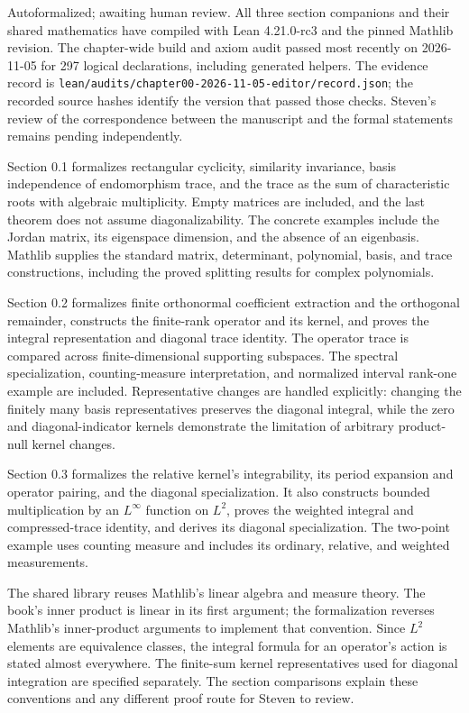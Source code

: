 \label{first-target-finite-dimensional-trace}

Autoformalized; awaiting human review. All three section companions and their shared mathematics have compiled with Lean 4.21.0-rc3 and the pinned Mathlib revision. The chapter-wide build and axiom audit passed most recently on 2026-11-05 for 297 logical declarations, including generated helpers. The evidence record is \texttt{lean/audits/chapter00-2026-11-05-editor/record.json}; the recorded source hashes identify the version that passed those checks. Steven's review of the correspondence between the manuscript and the formal statements remains pending independently.

Section 0.1 formalizes rectangular cyclicity, similarity invariance, basis independence of endomorphism trace, and the trace as the sum of characteristic roots with algebraic multiplicity. Empty matrices are included, and the last theorem does not assume diagonalizability. The concrete examples include the Jordan matrix, its eigenspace dimension, and the absence of an eigenbasis. Mathlib supplies the standard matrix, determinant, polynomial, basis, and trace constructions, including the proved splitting results for complex polynomials.

\label{chapter-zero-formalization-roadmap}

Section 0.2 formalizes finite orthonormal coefficient extraction and the orthogonal remainder, constructs the finite-rank operator and its kernel, and proves the integral representation and diagonal trace identity. The operator trace is compared across finite-dimensional supporting subspaces. The spectral specialization, counting-measure interpretation, and normalized interval rank-one example are included. Representative changes are handled explicitly: changing the finitely many basis representatives preserves the diagonal integral, while the zero and diagonal-indicator kernels demonstrate the limitation of arbitrary product-null kernel changes.

Section 0.3 formalizes the relative kernel's integrability, its period expansion and operator pairing, and the diagonal specialization. It also constructs bounded multiplication by an $L^\infty$ function on $L^2$, proves the weighted integral and compressed-trace identity, and derives its diagonal specialization. The two-point example uses counting measure and includes its ordinary, relative, and weighted measurements.

The shared library reuses Mathlib's linear algebra and measure theory. The book's inner product is linear in its first argument; the formalization reverses Mathlib's inner-product arguments to implement that convention. Since $L^2$ elements are equivalence classes, the integral formula for an operator's action is stated almost everywhere. The finite-sum kernel representatives used for diagonal integration are specified separately. The section comparisons explain these conventions and any different proof route for Steven to review.

